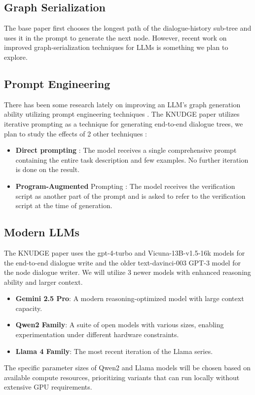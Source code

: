 \documentclass[12pt,a4paper]{article}
\begin{document}
\subsection{Graph Serialization}
The base paper first chooses the longest path of the dialogue-history sub-tree and uses it in the prompt to generate the next node. However, recent work on improved graph-serialization techniques for LLMs \cite{GraphLinearization}\cite{GraphBC} is something we plan to explore.

\subsection{Prompt Engineering}
There has been some research lately on improving an LLM's graph generation ability utilizing prompt engineering techniques \cite{demirci-etal-2025-llms}\cite{yao2024exploringpotentiallargelanguage}. The KNUDGE paper utilizes iterative prompting as a technique for generating end-to-end dialogue trees, we plan to study the effects of 2 other techniques :
\begin{itemize}
	\item \textbf{Direct prompting} : The model receives a single comprehensive prompt containing the entire task description and few examples. No further iteration is done on the result.
	\item \textbf{Program-Augmented} Prompting : The model receives the verification script as another part of the prompt and is asked to refer to the verification script at the time of generation.
\end{itemize}
\subsection{Modern LLMs}
The KNUDGE paper uses the gpt-4-turbo\cite{openai2024gpt4technicalreport} and Vicuna-13B-v1.5-16k models for the end-to-end dialogue write and the older text-davinci-003 GPT-3 model for the node dialogue writer. We will utilize 3 newer models with enhanced reasoning ability and larger context.
\begin{itemize}
	\item \textbf{Gemini 2.5 Pro}: A modern reasoning-optimized model with large context capacity.
	\item \textbf{Qwen2 Family}: A suite of open models with various sizes, enabling experimentation under different hardware constraints.
	\item \textbf{Llama 4 Family}: The most recent iteration of the Llama series.
\end{itemize}
The specific parameter sizes of Qwen2 and Llama models will be chosen based on available compute resources, prioritizing variants that can run locally without extensive GPU requirements.
\end{document}

